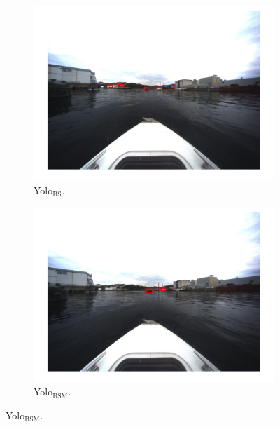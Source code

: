 \vspace{3mm}
\begin{figure}[h!]
\centering
\begin{subfigure}[b]{0.6\textwidth}
   \includegraphics[width=1\linewidth]{results/kamsvag/yolo1_figure_1451.jpg}
   \caption{Yolo$_{\text{BS}}$.}
\end{subfigure}

\begin{subfigure}[b]{0.6\textwidth}
   \includegraphics[width=1\linewidth]{results/kamsvag/yolo2_figure_1479.jpg}
   \caption{Yolo$_{\text{BSM}}$.}
\end{subfigure}


\end{figure}

